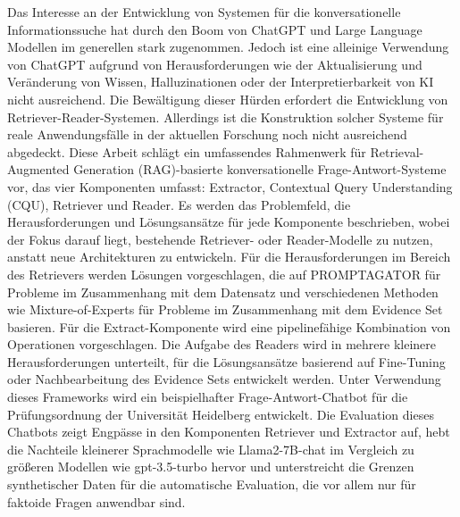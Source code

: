 Das Interesse an der Entwicklung von Systemen für die konversationelle Informationssuche hat durch den Boom von ChatGPT und Large Language Modellen im generellen stark zugenommen. Jedoch ist eine alleinige Verwendung von ChatGPT aufgrund von Herausforderungen wie der Aktualisierung und Veränderung von Wissen, Halluzinationen oder der Interpretierbarkeit von KI nicht ausreichend. Die Bewältigung dieser Hürden erfordert die Entwicklung von Retriever-Reader-Systemen. Allerdings ist die Konstruktion solcher Systeme für reale Anwendungsfälle in der aktuellen Forschung noch nicht ausreichend abgedeckt. Diese Arbeit schlägt ein umfassendes Rahmenwerk für Retrieval-Augmented Generation (RAG)-basierte konversationelle Frage-Antwort-Systeme vor, das vier Komponenten umfasst: Extractor, Contextual Query Understanding (CQU), Retriever und Reader. Es werden das Problemfeld, die Herausforderungen und Lösungsansätze für jede Komponente beschrieben, wobei der Fokus darauf liegt, bestehende Retriever- oder Reader-Modelle zu nutzen, anstatt neue Architekturen zu entwickeln. Für die Herausforderungen im Bereich des Retrievers werden Lösungen vorgeschlagen, die auf PROMPTAGATOR für Probleme im Zusammenhang mit dem Datensatz und verschiedenen Methoden wie Mixture-of-Experts für Probleme im Zusammenhang mit dem Evidence Set basieren. Für die Extract-Komponente wird eine pipelinefähige Kombination von Operationen vorgeschlagen. Die Aufgabe des Readers wird in mehrere kleinere Herausforderungen unterteilt, für die Lösungsansätze basierend auf Fine-Tuning oder Nachbearbeitung des Evidence Sets entwickelt werden. Unter Verwendung dieses Frameworks wird ein beispielhafter Frage-Antwort-Chatbot für die Prüfungsordnung der Universität Heidelberg entwickelt. Die Evaluation dieses Chatbots zeigt Engpässe in den Komponenten Retriever und Extractor auf, hebt die Nachteile kleinerer Sprachmodelle wie Llama2-7B-chat im Vergleich zu größeren Modellen wie gpt-3.5-turbo hervor und unterstreicht die Grenzen synthetischer Daten für die automatische Evaluation, die vor allem nur für faktoide Fragen anwendbar sind.